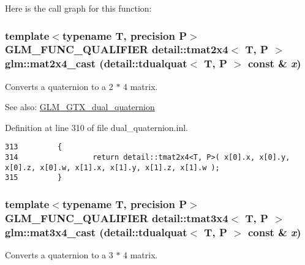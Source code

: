 Here is the call graph for this function:\hypertarget{group__gtc__dual__quaternion_g5dbb18f30b7a8d6646efd9e765e04535}{
\subsubsection[mat2x4\_\-cast]{\setlength{\rightskip}{0pt plus 5cm}template$<$typename T, precision P$>$ GLM\_\-FUNC\_\-QUALIFIER detail::tmat2x4$<$ T, P $>$ glm::mat2x4\_\-cast (detail::tdualquat$<$ T, P $>$ const \& {\em x})}}
\label{group__gtc__dual__quaternion_g5dbb18f30b7a8d6646efd9e765e04535}


Converts a quaternion to a 2 $\ast$ 4 matrix.

\begin{Desc}
\item[See also:]\hyperlink{group__gtc__dual__quaternion}{GLM\_\-GTX\_\-dual\_\-quaternion} \end{Desc}


Definition at line 310 of file dual\_\-quaternion.inl.

\begin{Code}\begin{verbatim}313         {
314                 return detail::tmat2x4<T, P>( x[0].x, x[0].y, x[0].z, x[0].w, x[1].x, x[1].y, x[1].z, x[1].w );
315         }
\end{verbatim}
\end{Code}


\hypertarget{group__gtc__dual__quaternion_gbd9f9dad6fbec2e89d5b239b8dc37096}{
\subsubsection[mat3x4\_\-cast]{\setlength{\rightskip}{0pt plus 5cm}template$<$typename T, precision P$>$ GLM\_\-FUNC\_\-QUALIFIER detail::tmat3x4$<$ T, P $>$ glm::mat3x4\_\-cast (detail::tdualquat$<$ T, P $>$ const \& {\em x})}}
\label{group__gtc__dual__quaternion_gbd9f9dad6fbec2e89d5b239b8dc37096}


Converts a quaternion to a 3 $\ast$ 4 matrix.

